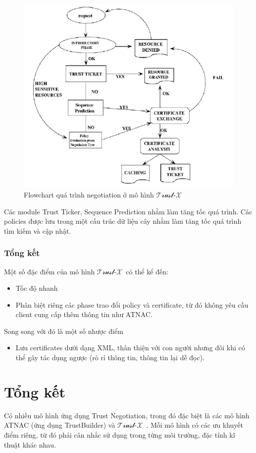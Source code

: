 \documentclass[12pt]{article}
\newcommand{\trustx}{$\mathcal{\text{Trust-}X}$\ }
\begin{document}
\begin{figure}[H]
\centering
\includegraphics[scale=.8]{img/trustx-architecture.png}
\caption{Flowchart quá trình negotiation ở mô hình \trustx}
\end{figure}

Các module Trust Ticker, Sequence Prediction nhằm làm tăng tốc quá trình. Các policies được lưu trong một cấu trúc dữ liệu cây nhằm làm tăng tốc quá trình tìm kiếm và cập nhật.

\subsubsection{Tổng kết}
Một số đặc điểm của mô hình \trustx có thể kể đến:
\begin{itemize}
\item Tốc độ nhanh
\item Phân biệt riêng các phase trao đổi policy và certificate, từ đó không yêu cầu client cung cấp thêm thông tin như ATNAC.
\end{itemize}
Song song với đó là một số nhược điểm
\begin{itemize}
\item Lưu certificates dưới dạng XML, thân thiện với con người nhưng đôi khi có thể gây tác dụng ngược (rò rỉ thông tin, thông tin lại dễ đọc).
\end{itemize}

\section{Tổng kết}
Có nhiều mô hình ứng dụng Trust Negotiation, trong đó đặc biệt là các mô hình ATNAC (ứng dụng TrustBuilder) và \trustx. Mỗi mô hình có các ưu khuyết điểm riêng, từ đó phải cân nhắc sử dụng trong từng môi trường, đặc tính kĩ thuật khác nhau.



\end{document}
